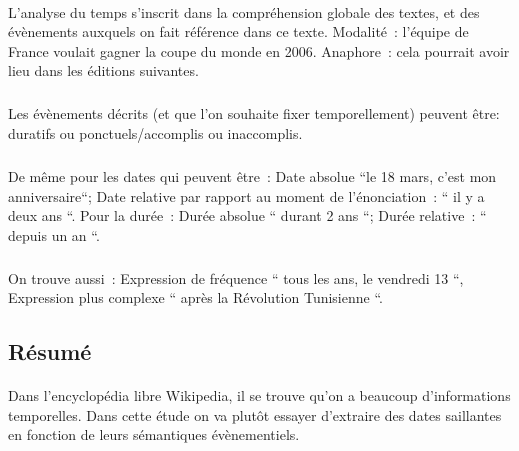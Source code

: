 \paragraph{}
L’analyse du temps s’inscrit dans la compréhension globale des textes, et des évènements auxquels on fait référence dans ce texte. 
\newline
Modalité~: l’équipe de France voulait gagner la coupe du monde en 2006. 
\newline
Anaphore~: cela pourrait avoir lieu dans les éditions suivantes.
\subparagraph{}
Les évènements décrits (et que l’on souhaite fixer temporellement) peuvent être: duratifs ou ponctuels/accomplis ou inaccomplis. 
\subparagraph{}
De même pour les dates qui peuvent être~: Date absolue ``le 18 mars, c'est mon anniversaire``; Date relative par rapport au moment de l’énonciation~: `` il y a deux ans ``. Pour la durée~: Durée absolue `` durant 2 ans ``; Durée relative~: `` depuis un an ``.
\subparagraph{}
On trouve aussi~: Expression de fréquence `` tous les ans, le vendredi 13 ``, Expression plus complexe `` après la Révolution Tunisienne ``.
\subsection*{Résumé}
\paragraph{}
Dans l'encyclopédia libre Wikipedia, il se trouve qu’on a beaucoup d’informations temporelles. Dans cette étude on va plutôt essayer d’extraire des dates saillantes en fonction de leurs sémantiques évènementiels.








